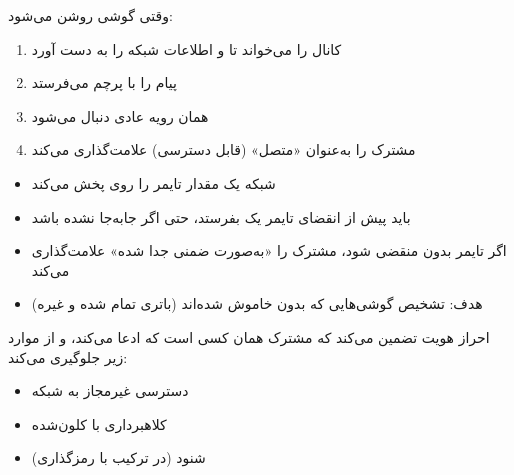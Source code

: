 



وقتی گوشی روشن می‌شود:

\begin{enumerate}
\def\labelenumi{\arabic{enumi}.}
\tightlist
\item
   کانال  را می‌خواند تا  و اطلاعات شبکه را به دست آورد
\item
   پیام  را با پرچم  می‌فرستد
\item
  همان رویه  عادی دنبال می‌شود
\item
   مشترک را به‌عنوان «متصل» (قابل دسترسی) علامت‌گذاری می‌کند
\end{enumerate}


\begin{itemize}
\tightlist
\item
  شبکه یک مقدار تایمر  را روی  پخش می‌کند
\item
   باید پیش از انقضای تایمر یک  بفرستد، حتی اگر جابه‌جا نشده باشد
\item
  اگر تایمر بدون  منقضی شود،  مشترک را «به‌صورت ضمنی جدا شده» علامت‌گذاری می‌کند
\item
  هدف: تشخیص گوشی‌هایی که بدون  خاموش شده‌اند (باتری تمام شده و غیره)
\end{itemize}



\CNchained{}

احراز هویت تضمین می‌کند که مشترک همان کسی است که ادعا می‌کند، و از موارد زیر جلوگیری می‌کند:

\begin{itemize}
\tightlist
\item
  دسترسی غیرمجاز به شبکه
\item
  کلاهبرداری با  کلون‌شده
\item
  شنود (در ترکیب با رمزگذاری)
\end{itemize}

